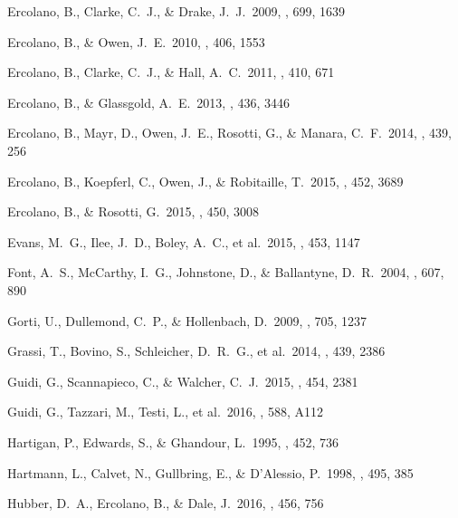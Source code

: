 \begin{thebibliography}{2000b}
 Ercolano, B., Clarke, 
C.~J., \& Drake, J.~J.\ 2009, \apj, 699, 1639 

 Ercolano, B., \& Owen, J.~E.\ 2010, \mnras, 406, 1553 

 Ercolano, B., Clarke, 
C.~J., \& Hall, A.~C.\ 2011, \mnras, 410, 671 

 Ercolano, B., \& Glassgold, A.~E.\ 2013, \mnras, 436, 3446 

 Ercolano, B., Mayr, 
D., Owen, J.~E., Rosotti, G., \& Manara, C.~F.\ 2014, \mnras, 439, 256 

 Ercolano, B., 
Koepferl, C., Owen, J., \& Robitaille, T.\ 2015, \mnras, 452, 3689 

 Ercolano, B., \& Rosotti, G.\ 2015, \mnras, 450, 3008 

 Evans, M.~G., Ilee, 
J.~D., Boley, A.~C., et al.\ 2015, \mnras, 453, 1147 

 Font, A.~S., McCarthy, 
I.~G., Johnstone, D., \& Ballantyne, D.~R.\ 2004, \apj, 607, 890 

 Gorti, U., Dullemond, 
C.~P., \& Hollenbach, D.\ 2009, \apj, 705, 1237 

 Grassi, T., Bovino, S., Schleicher, D.~R.~G., et al.\ 2014, \mnras, 439, 2386

 Guidi, G.,
  Scannapieco, C., \& Walcher, C.~J.\ 2015, \mnras, 454, 2381 

 Guidi, G., Tazzari, M., Testi, L., et al.\ 2016, \aap, 588, A112

 Hartigan, P., Edwards, 
S., \& Ghandour, L.\ 1995, \apj, 452, 736 

 Hartmann, L., Calvet, 
N., Gullbring, E., \& D'Alessio, P.\ 1998, \apj, 495, 385 

 Hubber, D.~A., Ercolano, B., \& Dale, J.\ 2016, \mnras, 456, 756


\end{thebibliography}

